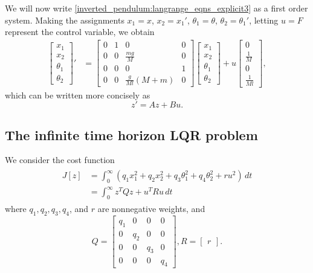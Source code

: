 We will now write \eqref{inverted_pendulum:langrange_eqns_explicit3} as a first order system. 
Making the assignments $x_1 = x$, $x_2 = x_1'$, $\theta_1 = \theta$, $\theta_2 = \theta_1'$, letting $u = F$ represent the control variable, we obtain 
\begin{align*}
\begin{bmatrix}
x_1\\
x_2 \\
\theta_1 \\
\theta_2
\end{bmatrix}' &= 
\begin{bmatrix}
0 & 1 & 0 & 0\\
0 & 0 & \frac{mg}{M} & 0 \\
0 & 0 & 0 & 1 \\
0 & 0 & \frac{g}{Ml}(M+m) & 0
\end{bmatrix}
\begin{bmatrix}
x_1\\
x_2 \\
\theta_1 \\
\theta_2
\end{bmatrix} + u
\begin{bmatrix}
0\\
\frac{1}{M} \\
0 \\
\frac{1}{Ml}
\end{bmatrix},
\end{align*}
which can be written more concisely as 
\[z' = Az + Bu.\]

\subsection*{The infinite time horizon LQR problem}
We consider the cost function
\begin{align}
\begin{split}
J[z] &= \int_0^{\infty} (q_1x_1^2 + q_2x_2^2  + q_3\theta_1^2 + q_4\theta_2^2 + ru^2)\, dt\\
&= \int_0^{\infty} z^TQz + u^TRu \, dt
\end{split} \label{inverted_pendulum:LQR}
\end{align}
where $q_1, q_2, q_3, q_4$, and $r$ are nonnegative weights, and 
\[
Q = 
\begin{bmatrix}
q_1 & 0 & 0 & 0 \\
0 & q_2 & 0 & 0\\
0 & 0 & q_3 & 0 \\
0 & 0 & 0 & q_4
\end{bmatrix}, R = \begin{bmatrix} r \end{bmatrix}.
\]

